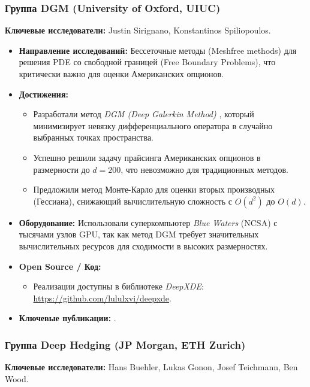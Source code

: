 \documentclass[12pt, a4paper]{article}
\begin{document}
\subsubsection{Группа DGM (University of Oxford, UIUC)}
\textbf{Ключевые исследователи:} Justin Sirignano, Konstantinos Spiliopoulos.

\begin{itemize}
    \item \textbf{Направление исследований:} Бессеточные методы (Meshfree methods) для решения PDE со свободной границей (Free Boundary Problems), что критически важно для оценки Американских опционов.
    \item \textbf{Достижения:}
    \begin{itemize}
        \item Разработали метод \textit{DGM (Deep Galerkin Method)} \cite{Sirignano2018}, который минимизирует невязку дифференциального оператора в случайно выбранных точках пространства.
        \item Успешно решили задачу прайсинга Американских опционов в размерности до $d=200$, что невозможно для традиционных методов.
        \item Предложили метод Монте-Карло для оценки вторых производных (Гессиана), снижающий вычислительную сложность с $O(d^2)$ до $O(d)$.
    \end{itemize}
    \item \textbf{Оборудование:} Использовали суперкомпьютер \textit{Blue Waters} (NCSA) с тысячами узлов GPU, так как метод DGM требует значительных вычислительных ресурсов для сходимости в высоких размерностях.
    \item \textbf{Open Source / Код:}
    \begin{itemize}
        \item Реализации доступны в библиотеке \textit{DeepXDE}: \url{https://github.com/lululxvi/deepxde}.
    \end{itemize}
    \item \textbf{Ключевые публикации:} \cite{Sirignano2018}.
\end{itemize}

\subsubsection{Группа Deep Hedging (JP Morgan, ETH Zurich)}
\textbf{Ключевые исследователи:} Hans Buehler, Lukas Gonon, Josef Teichmann, Ben Wood.
\end{document}
